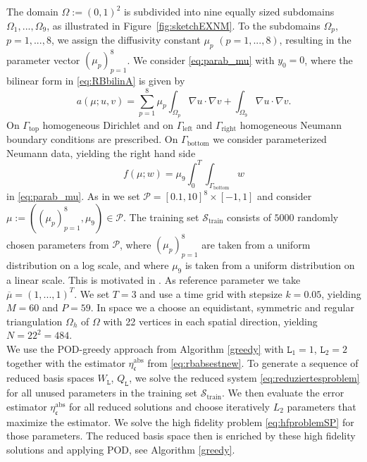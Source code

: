 \documentclass{article}
\theoremstyle{plain}
\theoremstyle{definition}
\theoremstyle{remark}
\newcommand{\RBestCcABS}{\eta_\mathfrak{c}^\text{abs}}
\begin{document}
The domain $\Omega:= (0,1)^2$ is subdivided into nine equally sized subdomains $\Omega_1, ..., \Omega_9$,  as illustrated in Figure~\ref{fig:sketchEXNM}.
To the subdomains $\Omega_p$, $p=1,...,8$, we assign the diffusivity constant $\mu_p$ $(p=1,...,8)$, resulting in the parameter vector $(\mu_p)_{p=1}^8$. We consider \eqref{eq:parab_mu} with $y_0=0$, where the bilinear form in \eqref{eq:RBbilinA} is given by
\begin{equation}
    a(\mu;u,v) = \sum_{p=1}^8 \mu_p \int_{\Omega_p} \nabla u \cdot \nabla v + \int_{\Omega_9} \nabla u \cdot \nabla v .
\end{equation}
On $\Gamma_\text{top}$ homogeneous Dirichlet and on $\Gamma_\text{left}$ and $\Gamma_\text{right}$ homogeneous Neumann boundary conditions are prescribed. On $\Gamma_\text{bottom}$ we consider parameterized Neumann data, yielding the right hand side
\begin{equation}
    f(\mu; w) = \mu_9 \int_0^T \int_{\Gamma_\text{bottom}} w
\end{equation}
in \eqref{eq:parab_mu}.
As in \cite{Hesthaven2016} we set $\mathcal{P} = [0.1,10]^8 \times [-1,1]$ and consider $\mu := ((\mu_p)_{p=1}^8,\mu_9)\in \mathcal P$. The training set $\mathcal{S}_{\text{train}}$ consists of $5000$ randomly chosen parameters from $\mathcal P$, where $(\mu_p)_{p=1}^8$ are taken from a uniform distribution on a log scale, and where $\mu_9$ is taken from a uniform distribution on a linear scale. This is motivated in \cites[§3.5.2]{RozzaRB}. As reference parameter we take $\overline{\mu} = (1,...,1)^T$. We set $T=3$ and use a time grid with stepsize  $k=0.05$, yielding $M = 60$ and $P=59$. In space we a choose an equidistant, symmetric and regular triangulation $\Omega_h$ of $\Omega$ with 22 vertices in each spatial direction, yielding $N = 22^2 = 484$.\\

We use the POD-greedy approach from Algorithm \ref{greedy} with $\texttt{L}_1 = 1$, $\texttt{L}_2 = 2$ together with the estimator $\RBestCcABS$ from \eqref{eq:rbabsestnew}. To generate a sequence of reduced basis spaces $W_\texttt{L}$, $Q_\texttt{L}$,
we solve the reduced system \eqref{eq:reduziertesproblem} for all unused parameters in the training set $\mathcal{S}_{\text{train}}$. We then evaluate the error estimator $\RBestCcABS$ for all reduced solutions
and choose iteratively $L_2$ parameters that maximize the estimator. We solve the high fidelity problem \eqref{eq:hfproblemSP} for those parameters. The reduced basis space then is enriched by these high fidelity solutions and applying POD, see Algorithm \ref{greedy}.
\end{document}
